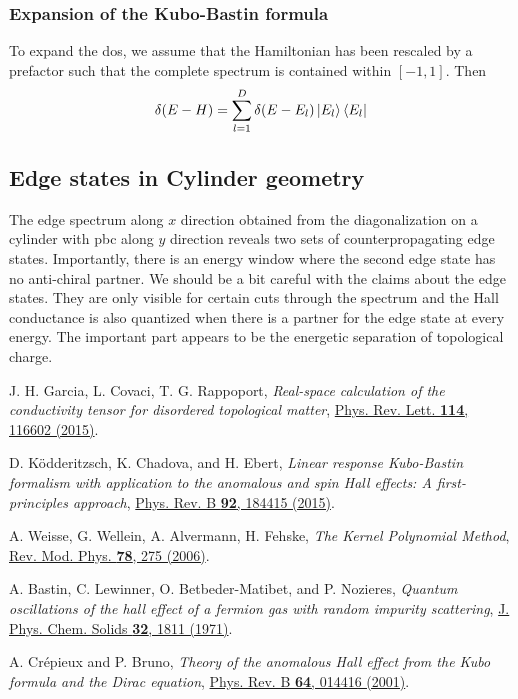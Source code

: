 \documentclass[aps,prl,amsmath,amssymb,twocolumn]{revtex4-2}
\newcommand{\BM}[1]{{\color{orange} #1}}
\begin{document}
\subsubsection{Expansion of the Kubo-Bastin formula}
To expand the \gls{dos}, we assume that the Hamiltonian has been rescaled by a prefactor such that the complete spectrum is contained within $[-1,1]$. Then
\begin{align}
\delta(E - H) = \sum_{l = 1}^D \delta(E - E_l) \ket{E_l}\bra{E_l}
\end{align} 


\subsection{Edge states in Cylinder geometry}
The edge spectrum along $x$ direction obtained from  the diagonalization on a cylinder with \gls{pbc} along $y$ direction reveals two sets of counterpropagating edge states. Importantly, there is an energy window where the second edge state has no anti-chiral partner. \BM{We should be a bit careful with the claims about the edge states. They are only visible for certain cuts through the spectrum and the Hall conductance is also quantized when there is a partner for the edge state at every energy. The important part appears to be the energetic separation of topological charge.}

\twocolumngrid



\begin{thebibliography}{10}
J. H. Garcia, L.  Covaci, T. G. Rappoport, {\em Real-space calculation of the conductivity tensor for disordered topological matter}, \href{https://journals.aps.org/prl/abstract/10.1103/PhysRevLett.114.116602}{Phys. Rev. Lett. {\bfseries 114}, 116602 (2015)}.

D. Ködderitzsch, K. Chadova, and H. Ebert, {\em Linear response Kubo-Bastin formalism with application to the anomalous and spin Hall effects: A first-principles approach}, \href{https://journals.aps.org/prb/abstract/10.1103/PhysRevB.92.184415}{Phys. Rev. B {\bfseries 92}, 184415 (2015)}.

A. Weisse, G. Wellein, A. Alvermann, H. Fehske, {\em The Kernel Polynomial Method}, \href{https://journals.aps.org/rmp/abstract/10.1103/RevModPhys.78.275}{Rev. Mod. Phys. {\bfseries 78}, 275 (2006)}.

A. Bastin, C. Lewinner, O. Betbeder-Matibet, and P.
Nozieres, {\em Quantum oscillations of the hall effect of a fermion gas with random impurity scattering}, \href{https://journals.aps.org/prb/abstract/10.1103/PhysRevB.64.014416}{ J. Phys. Chem. Solids {\bfseries 32}, 1811 (1971)}.

A. Cr\'epieux and P. Bruno, {\em Theory of the anomalous Hall effect from the Kubo formula and the Dirac equation}, \href{https://journals.aps.org/prb/abstract/10.1103/PhysRevB.64.014416}{Phys. Rev. B {\bfseries 64}, 014416 (2001)}.



\end{thebibliography}
\end{document}
